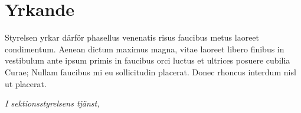 \documentclass[proposition]{fclass}
\begin{document}



\section*{Yrkande}
Styrelsen yrkar därför
\batt
phasellus venenatis risus faucibus metus laoreet condimentum. Aenean dictum maximus magna, vitae laoreet libero finibus in
\eatt
\batt
vestibulum ante ipsum primis in faucibus orci luctus et ultrices posuere cubilia Curae; Nullam faucibus mi eu sollicitudin placerat. Donec rhoncus interdum nisl ut placerat.
\eatt




\begin{signblock}
\vspace{15mm}
\emph{I sektionsstyrelsens tjänst, } %
\end{signblock}

\end{document}
